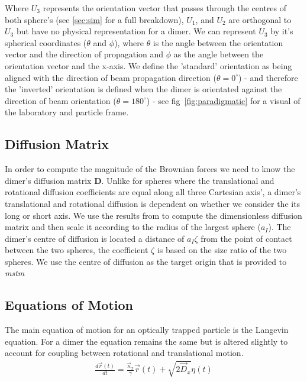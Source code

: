 Where $U_3$ represents the orientation vector that passes
through the centres of both sphere's (see \ref{sec:sim} 
for a full breakdown), $U_1$, and $U_2$ are orthogonal to 
$U_3$ but have no physical representation for a dimer. We 
can represent $U_3$ by it's spherical coordinates ($\theta$ 
and $\phi$), where $\theta$ is the angle between the 
orientation vector and the direction of propagation and 
$\phi$ as the angle between the orientation vector and 
the x-axis. We define the 'standard' orientation as 
being aligned with the direction of beam propagation 
direction ($\theta=0^\circ$) - and therefore the 'inverted' 
orientation is defined when the dimer is orientated against 
the direction of beam orientation ($\theta=180^\circ$) - see
fig~\ref{fig:paradigmatic} for a visual of the laboratory and
particle frame.  

\subsection{Diffusion Matrix}
In order to compute the magnitude of the Brownian forces we need to 
know the dimer's diffusion matrix \textbf{D}. Unlike for spheres 
where the translational and rotational diffusion coefficients are 
equal along all three Cartesian axis', a dimer's translational and 
rotational diffusion is dependent on whether we consider the its 
long or short axis. We use the results from \cite{Nir1973} to 
compute the dimensionless diffusion matrix and then scale it 
according to the radius of the largest sphere ($a_I$). The dimer's 
centre of diffusion is located a distance of $a_I\zeta$ from the 
point of contact between the two spheres, the coefficient $\zeta$ 
is based on the size ratio of the two spheres. We use the centre of 
diffusion as the target origin that is provided to \textit{mstm}

\subsection{Equations of Motion}
\label{sec:eq_of_motion}
The main equation of motion for an optically trapped particle is the 
Langevin equation. For a dimer the equation remains the same but is 
altered slightly to account for coupling between rotational and 
translational motion. 
\begin{align}
	\frac{{d}\vec{r}(t)}{{dt}} = \frac{\vec{\kappa}_x}{\gamma}\vec{r}(t) + 
	\sqrt{2\vec{D}_x}\eta(t)
\end{align}

